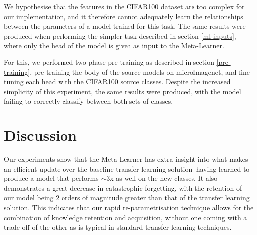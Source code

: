 \documentclass{report}
\begin{document}
We hypothesise that the features in the CIFAR100 dataset are too complex for our implementation, and it therefore cannot adequately learn the relationships between the parameters of a model trained for this task. The same results were produced when performing the simpler task described in section \ref{ml-inputs}, where only the head of the model is given as input to the Meta-Learner. \par
For this, we performed two-phase pre-training as described in section \ref{pre-training}, pre-training the body of the source models on microImagenet, and fine-tuning each head with the CIFAR100 source classes. Despite the increased simplicity of this experiment, the same results were produced, with the model failing to correctly classify between both sets of classes. \par


\section{Discussion}
Our experiments show that the Meta-Learner has extra insight into what makes an efficient update over the baseline transfer learning solution, having learned to produce a model that performs $\sim$3x as well on the new classes. It also demonstrates a great decrease in catastrophic forgetting, with the retention of our model being 2 orders of magnitude greater than that of the transfer learning solution. This indicates that our rapid re-parametrisation technique allows for the combination of knowledge retention and acquisition, without one coming with a trade-off of the other as is typical in standard transfer learning techniques.
\end{document}
